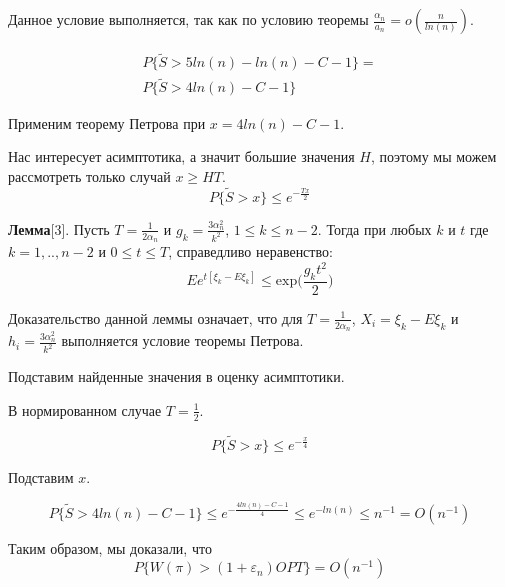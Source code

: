 \documentclass[a4paper, 14pt]{extarticle}
\numberwithin{equation}{section}
\begin{document}
Данное условие выполняется, так как по условию теоремы $\frac{\alpha_n}{a_n} = o(\frac{n}{ln(n)})$.

\begin{equation*}
\begin{aligned}
P\{\tilde{S} >5ln(n) - ln(n) - C - 1  \} = \\
P\{\tilde{S} >4ln(n) - C - 1  \}
\end{aligned}
\end{equation*}

Применим теорему Петрова при $x = 4ln(n) - C - 1 $.

Нас интересует асимптотика, а значит большие значения $H$, поэтому мы можем рассмотреть только случай $x \geqslant HT$.
\begin{equation*}
P\{\tilde{S} >x \} \leqslant e^{-\frac{Tx}{2}}
\end{equation*}

\textbf{Лемма}[3]. Пусть $T = \frac{1}{2\alpha_n}$ и $g_k = \frac{3\alpha_n^2}{k^2}$, $1 \leqslant k \leqslant n-2$. Тогда при любых $k$ и $t$ где $k=1,..,n-2$ и $0 \leqslant t \leqslant T$, справедливо неравенство:
\begin{equation*}
Ee^{t[\xi_k-E\xi_k]} \leqslant \mathrm{exp} \Big(\frac{g_k t^2}{2} \Big)
\end{equation*}


Доказательство данной леммы означает, что для $T = \frac{1}{2\alpha_n}$, $X_i = \xi_k-E\xi_k$ и $h_i = \frac{3\alpha_n^2}{k^2}$ выполняется условие теоремы Петрова.

Подставим найденные значения в оценку асимптотики.

В нормированном случае $T = \frac{1}{2}$.

\begin{equation*}
P\{\tilde{S} >x \} \leqslant e^{-\frac{x}{4}}
\end{equation*}

Подставим $x$.

\begin{equation*}
P\{\tilde{S} >4ln(n) - C - 1 \} \leqslant e^{-\frac{4ln(n) - C - 1}{4}} \leqslant e^{-ln(n)} \leqslant n^{-1} = O(n^{-1})
\end{equation*}

Таким образом, мы доказали, что
\begin{equation*}
P\{ W(\pi)>(1+\varepsilon_n)OPT \} = O(n^{-1})
\end{equation*}\\
\end{document}
